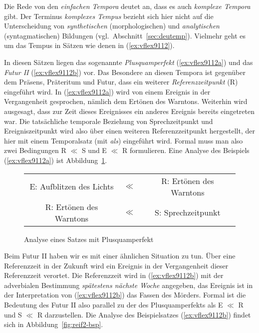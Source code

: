 Die Rede von den \textit{einfachen Tempora} deutet an, dass es auch \textit{komplexe Tempora} gibt.
Der Terminus \textit{komplexes Tempus} bezieht sich hier nicht auf die Unterscheidung von \textit{synthetischen} (morphologischen) und \textit{analytischen} (syntagmatischen) Bildungen (vgl.\ Abschnitt~\ref{sec:deutemp}).
Vielmehr geht es um das Tempus in Sätzen wie denen in (\ref{ex:vflex9112}).

\begin{exe}
  \ex\label{ex:vflex9112}
  \begin{xlist}
  \end{xlist}
\end{exe}


In diesen Sätzen liegen das sogenannte \textit{Plusquamperfekt} (\ref{ex:vflex9112a}) und das \textit{Futur II} (\ref{ex:vflex9112b}) vor.
Das Besondere an diesen Tempora ist gegenüber dem Präsens, Präteritum und Futur, dass ein weiterer \textit{Referenzzeitpunkt} (R) eingeführt wird.
In (\ref{ex:vflex9112a}) wird von einem Ereignis in der Vergangenheit gesprochen, nämlich dem Ertönen des Warntons.
Weiterhin wird ausgesagt, dass zur Zeit dieses Ereignisses ein anderes Ereignis bereits eingetreten war.
Die tatsächliche temporale Beziehung von Sprechzeitpunkt und Ereigniszeitpunkt wird also über einen weiteren Referenzzeitpunkt hergestellt, der hier mit einem Temporalsatz (mit \textit{als}) eingeführt wird.
Formal muss man also zwei Bedingungen R $\ll$ S und E $\ll$ R formulieren.
Eine Analyse des Beispiels (\ref{ex:vflex9112a}) ist Abbildung~\ref{fig:reiplsq-bsp}.

\begin{figure}
  \centering
  \begin{tabular}{ccc}
    E: Aufblitzen des Lichts & $\ll$ & R: Ertönen des Warntons \\
    R: Ertönen des Warntons & $\ll$ & S: Sprechzeitpunkt \\
  \end{tabular}
  \caption{Analyse eines Satzes mit Plusquamperfekt}
  \label{fig:reiplsq-bsp}
\end{figure}

Beim Futur II haben wir es mit einer ähnlichen Situation zu tun.
Über eine Referenzzeit in der Zukunft wird ein Ereignis in der Vergangenheit dieser Referenzzeit verortet.
Die Referenzzeit wird in (\ref{ex:vflex9112b}) mit der adverbialen Bestimmung \textit{spätestens nächste Woche} angegeben, das Ereignis ist in der Interpretation von (\ref{ex:vflex9112b}) das Fassen des Mörders.
Formal ist die Bedeutung des Futur II also parallel zu der des Plusquamperfekts als E $\ll$ R und  S $\ll$ R darzustellen.
Die Analyse des Beispielsatzes (\ref{ex:vflex9112b}) findet sich in Abbildung~\ref{fig:reif2-bsp}.

